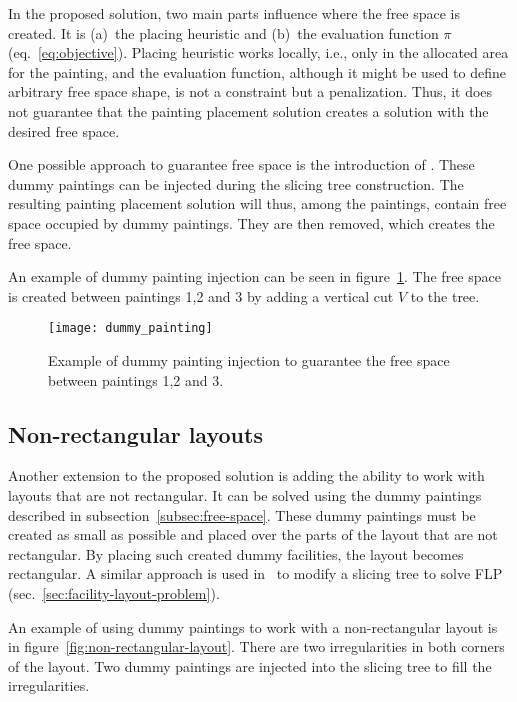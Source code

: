 In the proposed solution, two main parts influence where the free space is created.
It is (a)~the placing heuristic and (b)~the evaluation function $\pi$ (eq.~\ref{eq:objective}).
Placing heuristic works locally, i.e., only in the allocated area for the painting, and the evaluation
function, although it might be used to define arbitrary free space shape, is not a constraint but a penalization.
Thus, it does not guarantee that the painting placement solution creates a solution with the desired free space.

One possible approach to guarantee free space is the introduction of .
These dummy paintings can be injected during the slicing tree construction.
The resulting painting placement solution will thus, among the paintings, contain free space occupied by dummy paintings.
They are then removed, which creates the free space.

An example of dummy painting injection can be seen in figure~\ref{fig:dummy-painting}.
The free space is created between paintings 1,2 and 3 by adding a vertical cut $V$ to the tree.


\begin{figure}[h!]
    \texttt{[image: dummy\_painting]}
    \caption[Example of dummy painting injection]{Example of dummy painting injection to guarantee the free space between paintings 1,2 and 3.}
    \label{fig:dummy-painting}
\end{figure}

\subsection{Non-rectangular layouts}\label{subsec:non-rectangular-layouts}

Another extension to the proposed solution is adding the ability to work with layouts that are not rectangular.
It can be solved using the dummy paintings described in subsection~\ref{subsec:free-space}.
These dummy paintings must be created as small as possible and placed over the parts of the layout that are not rectangular.
By placing such created dummy facilities, the layout becomes rectangular.
A similar approach is used in~\cite{scholzExtensionsSTaTSPractical2010} to modify a slicing tree to solve FLP (sec.~\ref{sec:facility-layout-problem}).

An example of using dummy paintings to work with a non-rectangular layout is in figure~\ref{fig:non-rectangular-layout}.
There are two irregularities in both corners of the layout.
Two dummy paintings are injected into the slicing tree to fill the irregularities.

